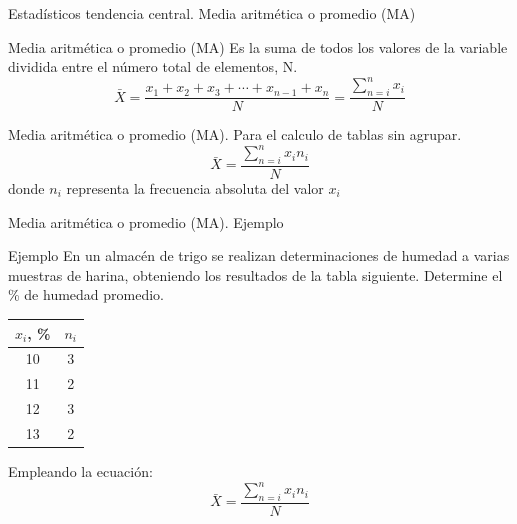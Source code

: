 \documentclass[11pt]{beamer}
\begin{document}
        \begin{frame}{Estadísticos tendencia central. Media aritmética o promedio (MA)}
            \begin{block}{Media aritmética o promedio (MA)}
              Es la suma de todos los valores de la variable dividida entre el número total de elementos, N.
              $$ \bar{X} = \dfrac{x_1+x_2+x_3+\cdots+x_{n-1}+x_n}{N}=\dfrac{\sum_{n=i}^{n}x_i}{N}$$
            \end{block}
            \pause
            \begin{block}{Media aritmética o promedio (MA). Para el calculo de tablas sin agrupar.}
              $$ \bar{X} =\dfrac{\sum_{n=i}^{n}x_in_i}{N}$$
              donde $n_i$ representa la frecuencia absoluta del valor $x_i$
            \end{block}

        \end{frame}
        \begin{frame}{Media aritmética o promedio (MA). Ejemplo}
          \begin{block}{Ejemplo}
            En un almacén de trigo se realizan determinaciones de humedad a varias muestras de harina, obteniendo los resultados de la tabla siguiente. Determine el \% de humedad promedio.
            \begin{table}[!h]
                \centering
                \begin{tabular}{|c|c|}
                    \hline
                    $x_i$, \% & $n_i$\\
                    \hline
                    10  & 3\\
                    \hline
                    11  & 2\\
                    \hline
                    12  & 3\\
                    \hline
                    13  & 2\\
                    \hline
                \end{tabular}
            \end{table}
          \end{block}
          Empleando la ecuación:\\
          $$ \bar{X} =\dfrac{\sum_{n=i}^{n}x_in_i}{N}$$
        \end{frame}
\end{document}
